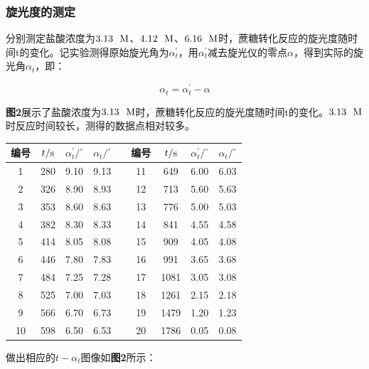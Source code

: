 \documentclass[12pt]{article}
\begin{document}
	 		\subsubsection{旋光度的测定}
			分别测定盐酸浓度为$3.13\ \ {\rm M}$、$4.12\ \ {\rm M}$、$6.16\ \ {\rm M}$时，蔗糖转化反应的旋光度随时间t的变化。记实验测得原始旋光角为$\alpha^{\prime}_{t}$，用$\alpha^{\prime}_{t}$减去旋光仪的零点$\alpha$，得到实际的旋光角$\alpha_{t}$，即：\par
			$$
			\alpha_{t}=\alpha^{\prime}_{t}-\alpha
			$$
			\par
			\textbf{图2}展示了盐酸浓度为$3.13\ \ {\rm M}$时，蔗糖转化反应的旋光度随时间t的变化。$3.13\ \ {\rm M}$时反应时间较长，测得的数据点相对较多。\par
			\begin{table}[!h]
				\centering
				\begin{tabular}{ccccccccc}
					\toprule
					编号 & $t/{\rm s}$ & $\alpha^{\prime}_{t}/^{\circ}$ & $\alpha_{t}/^{\circ}$&&编号& $t/{\rm s}$ & $\alpha^{\prime}_{t}/^{\circ}$ & $\alpha_{t}/^{\circ}$\\
					\midrule
					1  & 280 & 9.10 & 9.13 &  & 11 & 649  & 6.00 & 6.03 \\
					2  & 326 & 8.90 & 8.93 &  & 12 & 713  & 5.60 & 5.63 \\
					3  & 353 & 8.60 & 8.63 &  & 13 & 776  & 5.00 & 5.03 \\
					4  & 382 & 8.30 & 8.33 &  & 14 & 841  & 4.55 & 4.58 \\
					5  & 414 & 8.05 & 8.08 &  & 15 & 909  & 4.05 & 4.08 \\
					6  & 446 & 7.80 & 7.83 &  & 16 & 991  & 3.65 & 3.68 \\
					7  & 484 & 7.25 & 7.28 &  & 17 & 1081 & 3.05 & 3.08 \\
					8  & 525 & 7.00 & 7.03 &  & 18 & 1261 & 2.15 & 2.18 \\
					9  & 566 & 6.70 & 6.73 &  & 19 & 1479 & 1.20 & 1.23 \\
					10 & 598 & 6.50 & 6.53 &  & 20 & 1786 & 0.05 & 0.08 \\
					\bottomrule
				\end{tabular}
			\end{table}
			做出相应的$t-\alpha_{t}$图像如\textbf{图2}所示：
\end{document}
